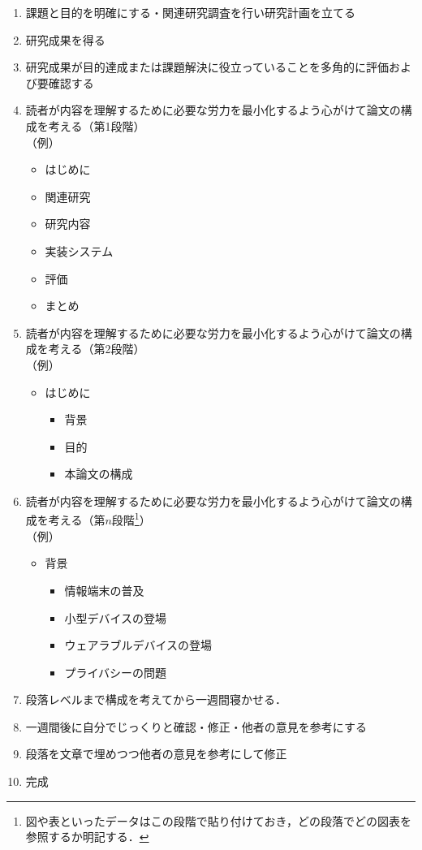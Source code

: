 \begin{enumerate}
  \item 課題と目的を明確にする・関連研究調査を行い研究計画を立てる
  \item 研究成果を得る
  \item 研究成果が目的達成または課題解決に役立っていることを多角的に評価および要確認する
  \item 読者が内容を理解するために必要な労力を最小化するよう心がけて論文の構成を考える（第1段階） \\ （例）
  \begin{itemize}
    \item はじめに
    \item 関連研究
    \item 研究内容
    \item 実装システム
    \item 評価
    \item まとめ
  \end{itemize}
  \item 読者が内容を理解するために必要な労力を最小化するよう心がけて論文の構成を考える（第2段階） \\ （例）
  \begin{itemize}
    \item はじめに
    \begin{itemize}
      \item 背景
      \item 目的
      \item 本論文の構成
    \end{itemize}
  \end{itemize}
    \item 読者が内容を理解するために必要な労力を最小化するよう心がけて論文の構成を考える（第$n$段階\footnote{図や表といったデータはこの段階で貼り付けておき，どの段落でどの図表を参照するか明記する．}） \\ （例）
    \begin{itemize}
      \item 背景
      \begin{itemize}
       \item 情報端末の普及
       \item 小型デバイスの登場
       \item ウェアラブルデバイスの登場
       \item プライバシーの問題
      \end{itemize}
    \end{itemize}
  \item 段落レベルまで構成を考えてから一週間寝かせる．
  \item 一週間後に自分でじっくりと確認・修正・他者の意見を参考にする
  \item 段落を文章で埋めつつ他者の意見を参考にして修正
  \item 完成
\end{enumerate}

